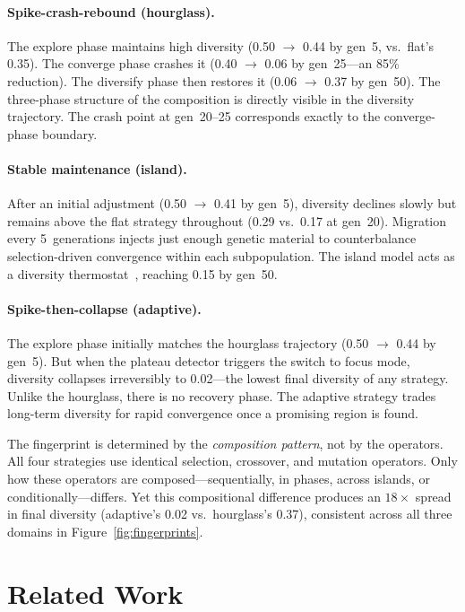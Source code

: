 \documentclass[dvipsnames,format=sigconf,anonymous=true,review=true]{acmart}
\begin{document}
\paragraph{Spike-crash-rebound (hourglass).}
The explore phase maintains high diversity (0.50 $\to$ 0.44 by gen~5, vs.\ flat's 0.35). The converge phase crashes it (0.40 $\to$ 0.06 by gen~25---an 85\% reduction). The diversify phase then restores it (0.06 $\to$ 0.37 by gen~50). The three-phase structure of the composition is directly visible in the diversity trajectory. The crash point at gen~20--25 corresponds exactly to the converge-phase boundary.

\paragraph{Stable maintenance (island).}
After an initial adjustment (0.50 $\to$ 0.41 by gen~5), diversity declines slowly but remains above the flat strategy throughout (0.29 vs.\ 0.17 at gen~20). Migration every 5~generations injects just enough genetic material to counterbalance selection-driven convergence within each subpopulation. The island model acts as a diversity thermostat~\cite{whitley1999island}, reaching 0.15 by gen~50.

\paragraph{Spike-then-collapse (adaptive).}
The explore phase initially matches the hourglass trajectory (0.50 $\to$ 0.44 by gen~5). But when the plateau detector triggers the switch to focus mode, diversity collapses irreversibly to 0.02---the lowest final diversity of any strategy. Unlike the hourglass, there is no recovery phase. The adaptive strategy trades long-term diversity for rapid convergence once a promising region is found.

The fingerprint is determined by the \emph{composition pattern}, not by the operators.
All four strategies use identical selection, crossover, and mutation operators.
Only how these operators are composed---sequentially, in phases, across islands, or conditionally---differs.
Yet this compositional difference produces an $18\times$ spread in final diversity (adaptive's 0.02 vs.\ hourglass's 0.37), consistent across all three domains in Figure~\ref{fig:fingerprints}.


\section{Related Work}
\end{document}

